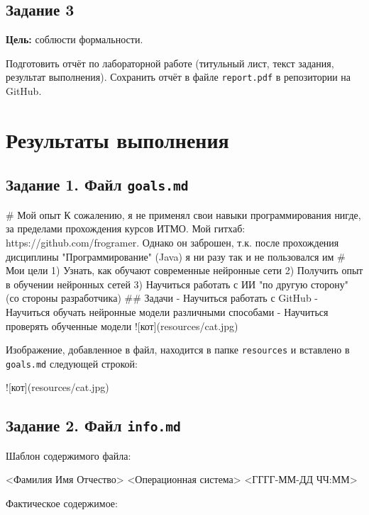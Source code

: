 \documentclass[a4paper,14pt]{extarticle}
\begin{document}
\subsection*{Задание 3}
\textbf{Цель:} соблюсти формальности.

Подготовить отчёт по лабораторной работе (титульный лист, текст задания, результат выполнения). Сохранить отчёт в файле \texttt{report.pdf} в репозитории на GitHub.

\newpage
\section{Результаты выполнения}

\subsection{Задание 1. Файл \texttt{goals.md}}

\begin{code}
# Мой опыт
К сожалению, я не применял свои навыки программирования нигде, за пределами прохождения курсов ИТМО. Мой гитхаб: https://github.com/frogramer. Однако он заброшен, т.к. после прохождения дисциплины "Программирование" (Java) я ни разу так и не пользовался им
# Мои цели
1) Узнать, как обучают современные нейронные сети
2) Получить опыт в обучении нейронных сетей
3) Научиться работать с ИИ "по другую сторону" (со стороны разработчика)
## Задачи
- Научиться работать с GitHub
- Научиться обучать нейронные модели различными способами
- Научиться проверять обученные модели
![кот](resources/cat.jpg)
\end{code}

Изображение, добавленное в файл, находится в папке \texttt{resources} и вставлено в \texttt{goals.md} следующей строкой:

\begin{code}
![кот](resources/cat.jpg)
\end{code}

\subsection{Задание 2. Файл \texttt{info.md}}

Шаблон содержимого файла:

\begin{code}
<Фамилия Имя Отчество>
<Операционная система>
<ГГГГ-ММ-ДД ЧЧ:ММ>
\end{code}

Фактическое содержимое:
\end{document}
